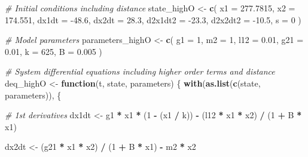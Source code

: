 \documentclass[12pt,twoside,openany]{reedthesis}
\newenvironment{Shaded}{\begin{snugshade}}{\end{snugshade}}
\newcommand{\CommentTok}[1]{\textcolor[rgb]{0.56,0.35,0.01}{\textit{#1}}}
\newcommand{\ControlFlowTok}[1]{\textcolor[rgb]{0.13,0.29,0.53}{\textbf{#1}}}
\newcommand{\DataTypeTok}[1]{\textcolor[rgb]{0.13,0.29,0.53}{#1}}
\newcommand{\DecValTok}[1]{\textcolor[rgb]{0.00,0.00,0.81}{#1}}
\newcommand{\FloatTok}[1]{\textcolor[rgb]{0.00,0.00,0.81}{#1}}
\newcommand{\KeywordTok}[1]{\textcolor[rgb]{0.13,0.29,0.53}{\textbf{#1}}}
\newcommand{\NormalTok}[1]{#1}
\newcommand{\OperatorTok}[1]{\textcolor[rgb]{0.81,0.36,0.00}{\textbf{#1}}}
\newcommand{\StringTok}[1]{\textcolor[rgb]{0.31,0.60,0.02}{#1}}
\begin{document}
\begin{Shaded}
\begin{Highlighting}[]
\CommentTok{# Initial conditions including distance}
\NormalTok{state_highO <-}\StringTok{ }\KeywordTok{c}\NormalTok{(}
  \DataTypeTok{x1 =} \FloatTok{277.7815}\NormalTok{, }
  \DataTypeTok{x2 =} \FloatTok{174.551}\NormalTok{,}
  \DataTypeTok{dx1dt =} \FloatTok{-48.6}\NormalTok{,}
  \DataTypeTok{dx2dt =} \FloatTok{28.3}\NormalTok{,}
  \DataTypeTok{d2x1dt2 =} \FloatTok{-23.3}\NormalTok{,}
  \DataTypeTok{d2x2dt2 =} \FloatTok{-10.5}\NormalTok{,}
  \DataTypeTok{s =} \DecValTok{0}
\NormalTok{)}

\CommentTok{# Model parameters}
\NormalTok{parameters_highO <-}\StringTok{ }\KeywordTok{c}\NormalTok{(}
  \DataTypeTok{g1 =} \DecValTok{1}\NormalTok{,}
  \DataTypeTok{m2 =} \DecValTok{1}\NormalTok{,}
  \DataTypeTok{l12 =} \FloatTok{0.01}\NormalTok{,}
  \DataTypeTok{g21 =} \FloatTok{0.01}\NormalTok{,}
  \DataTypeTok{k =} \DecValTok{625}\NormalTok{,}
  \DataTypeTok{B =} \FloatTok{0.005}
\NormalTok{)}

\CommentTok{# System differential equations including higher order terms and distance}
\NormalTok{deq_highO <-}\StringTok{ }\ControlFlowTok{function}\NormalTok{(t, state, parameters) \{}
  \KeywordTok{with}\NormalTok{(}\KeywordTok{as.list}\NormalTok{(}\KeywordTok{c}\NormalTok{(state, parameters)), \{}
    
  \CommentTok{# 1st derivatives}
\NormalTok{  dx1dt <-}
\StringTok{  }\NormalTok{g1 }\OperatorTok{*}\StringTok{ }\NormalTok{x1 }\OperatorTok{*}\StringTok{ }\NormalTok{(}\DecValTok{1} \OperatorTok{-}\StringTok{ }\NormalTok{(x1 }\OperatorTok{/}\StringTok{ }\NormalTok{k)) }\OperatorTok{-}\StringTok{ }\NormalTok{(l12 }\OperatorTok{*}\StringTok{ }\NormalTok{x1 }\OperatorTok{*}\StringTok{ }\NormalTok{x2) }\OperatorTok{/}\StringTok{ }\NormalTok{(}\DecValTok{1} \OperatorTok{+}\StringTok{ }\NormalTok{B }\OperatorTok{*}\StringTok{ }\NormalTok{x1)}
  
\NormalTok{  dx2dt <-}\StringTok{ }\NormalTok{(g21 }\OperatorTok{*}\StringTok{ }\NormalTok{x1 }\OperatorTok{*}\StringTok{ }\NormalTok{x2) }\OperatorTok{/}\StringTok{ }\NormalTok{(}\DecValTok{1} \OperatorTok{+}\StringTok{ }\NormalTok{B }\OperatorTok{*}\StringTok{ }\NormalTok{x1) }\OperatorTok{-}\StringTok{ }\NormalTok{m2 }\OperatorTok{*}\StringTok{ }\NormalTok{x2}
  

\end{Highlighting}
\end{Shaded}
\end{document}
